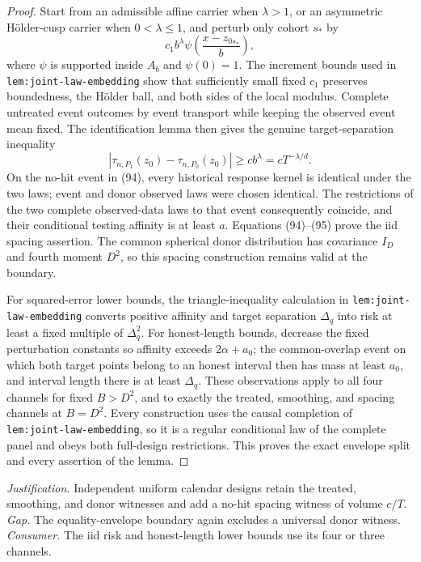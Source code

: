 \documentclass{article}
\begin{document}
\begin{proof}
Start from an admissible affine carrier when \(\lambda>1\), or an asymmetric H\"older-cusp carrier when \(0<\lambda\leq1\), and perturb only cohort \(s_*\) by
\[
c_1b^\lambda\psi\!\left(\frac{x-z_{0s_*}}b\right),
\]
where \(\psi\) is supported inside \(A_b\) and \(\psi(0)=1\).  The increment bounds used in \texttt{lem:joint-law-embedding} show that sufficiently small fixed \(c_1\) preserves boundedness, the H\"older ball, and both sides of the local modulus.  Complete untreated event outcomes by event transport while keeping the observed event mean fixed.  The identification lemma then gives the genuine target-separation inequality
\[
|\tau_{n,P_1}(z_0)-\tau_{n,P_0}(z_0)|
\geq cb^\lambda=cT^{-\lambda/d}.
\tag{95}
\]
On the no-hit event in (94), every historical response kernel is identical under the two laws; event and donor observed laws were chosen identical.  The restrictions of the two complete observed-data laws to that event consequently coincide, and their conditional testing affinity is at least \(a\).  Equations (94)--(95) prove the iid spacing assertion.  The common spherical donor distribution has covariance \(I_D\) and fourth moment \(D^2\), so this spacing construction remains valid at the boundary.

For squared-error lower bounds, the triangle-inequality calculation in \texttt{lem:joint-law-embedding} converts positive affinity and target separation \(\Delta_q\) into risk at least a fixed multiple of \(\Delta_q^2\).  For honest-length bounds, decrease the fixed perturbation constants so affinity exceeds \(2\alpha+a_0\); the common-overlap event on which both target points belong to an honest interval then has mass at least \(a_0\), and interval length there is at least \(\Delta_q\).  These observations apply to all four channels for fixed \(B>D^2\), and to exactly the treated, smoothing, and spacing channels at \(B=D^2\).  Every construction uses the causal completion of \texttt{lem:joint-law-embedding}, so it is a regular conditional law of the complete panel and obeys both full-design restrictions.  This proves the exact envelope split and every assertion of the lemma.
\end{proof}
\par\smallskip\noindent \textit{Justification.} Independent uniform calendar designs retain the treated, smoothing, and donor witnesses and add a no-hit spacing witness of volume \(c/T\). \textit{Gap.} The equality-envelope boundary again excludes a universal donor witness. \textit{Consumer.} The iid risk and honest-length lower bounds use its four or three channels.
\end{document}
